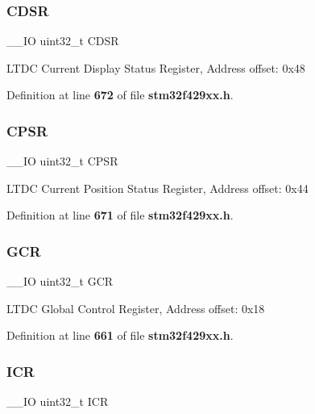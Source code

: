 \mbox{\label{structLTDC__TypeDef_a5e235993884b3f8d42db5f51d9bd1942}} 
\subsubsection{C\+D\+SR}
{\footnotesize\ttfamily \+\_\+\+\_\+\+IO uint32\+\_\+t C\+D\+SR}

L\+T\+DC Current Display Status Register, Address offset\+: 0x48 

Definition at line \textbf{ 672} of file \textbf{ stm32f429xx.\+h}.

\mbox{\label{structLTDC__TypeDef_a140588a82bafbf0bf0c983111aadb351}} 
\subsubsection{C\+P\+SR}
{\footnotesize\ttfamily \+\_\+\+\_\+\+IO uint32\+\_\+t C\+P\+SR}

L\+T\+DC Current Position Status Register, Address offset\+: 0x44 

Definition at line \textbf{ 671} of file \textbf{ stm32f429xx.\+h}.

\mbox{\label{structLTDC__TypeDef_aae092d9d07574afe1fbc79c8bf7f7c19}} 
\subsubsection{G\+CR}
{\footnotesize\ttfamily \+\_\+\+\_\+\+IO uint32\+\_\+t G\+CR}

L\+T\+DC Global Control Register, Address offset\+: 0x18 

Definition at line \textbf{ 661} of file \textbf{ stm32f429xx.\+h}.

\mbox{\label{structLTDC__TypeDef_a0a8c8230846fd8ff154b9fde8dfa0399}} 
\subsubsection{I\+CR}
{\footnotesize\ttfamily \+\_\+\+\_\+\+IO uint32\+\_\+t I\+CR}

